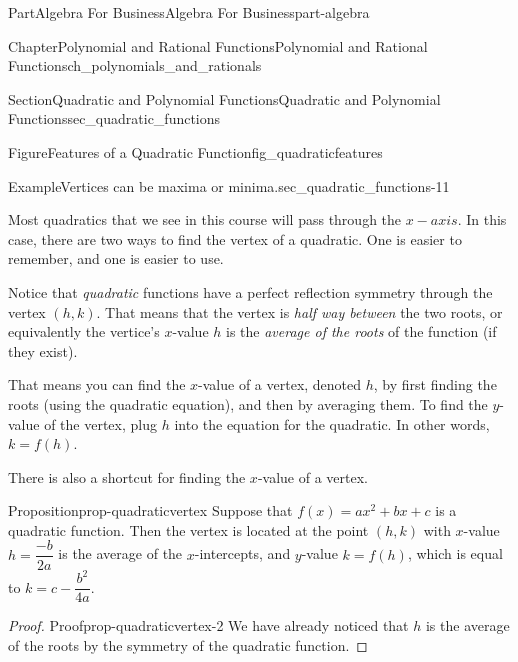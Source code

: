 \documentclass[oneside,10pt,]{tufte-book}
\numberwithin{equation}{chapter}
\begin{document}
\begin{partptx}{Part}{Algebra For Business}{}{Algebra For Business}{}{}{part-algebra}
\begin{chapterptx}{Chapter}{Polynomial and Rational Functions}{}{Polynomial and Rational Functions}{}{}{ch_polynomials_and_rationals}
\begin{sectionptx}{Section}{Quadratic and Polynomial Functions}{}{Quadratic and Polynomial Functions}{}{}{sec_quadratic_functions}
\begin{figureptx}{Figure}{Features of a Quadratic Function}{fig_quadraticfeatures}{}
\begin{image}{0.3}{0.4}{0.3}{}
{\begin{tikzpicture}
\end{tikzpicture}
}%
\end{image}%
\tcblower
\end{figureptx}%
\begin{example}{Example}{Vertices can be maxima or minima.}{sec_quadratic_functions-11}%
\begin{image}{0.125}{0.75}{0.125}{}%
%
\end{image}%
\end{example}
Most quadratics that we see in this course will pass through the \(x-axis\).  In this case, there are two ways to find the vertex of a quadratic.  One is easier to remember, and one is easier to use.%
\par
Notice that \emph{quadratic} functions have a perfect reflection symmetry through the vertex \((h,k)\). That means that the vertex is \emph{half way between} the two roots, or equivalently the vertice's \(x\)-value \(h\) is the \emph{average of the roots} of the function (if they exist).%
\par
That means you can find the \(x\)-value of a vertex, denoted \(h\), by first finding the roots (using the quadratic equation), and then by averaging them. To find the \(y\)-value of the vertex, plug \(h\) into the equation for the quadratic.  In other words, \(k=f(h)\).%
\par
There is also a shortcut for finding the \(x\)-value of a vertex.%
\begin{proposition}{Proposition}{}{}{prop-quadraticvertex}%
Suppose that \(f(x)=ax^2+ bx + c\) is a quadratic function.  Then the vertex is located at the point \((h,k)\) with \(x\)-value \(h=\dfrac{-b}{2a}\) is the average of the \(x\)-intercepts, and \(y\)-value \(k = f(h)\), which is equal to \(k=c-\dfrac{b^2}{4a}\).%
\end{proposition}
\begin{proof}{Proof}{}{prop-quadraticvertex-2}
We have already noticed that \(h\) is the average of the roots by the symmetry of the quadratic function.%

\end{proof}
\end{sectionptx}
\end{chapterptx}
\end{partptx}
\end{document}

